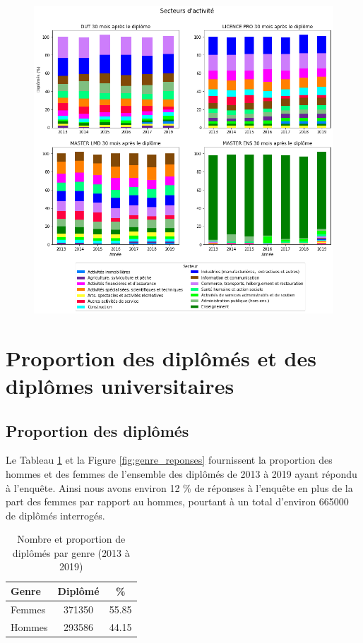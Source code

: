 \documentclass[12pt, a4paper, titlepage, table]{article}
\begin{document}
	\begin{figure}[H]
		\centering
		\includegraphics[width=1\textwidth]{../graphs/repartition_secteurs_situation.png}
	\end{figure}

\section{Proportion des diplômés et des diplômes universitaires}

	\subsection{Proportion des diplômés}
	Le Tableau \ref{tab:genre_responses} et la Figure \ref{fig:genre_reponses} fournissent la proportion des hommes et des femmes de l'ensemble des diplômés de 2013 à 2019 ayant répondu à l'enquête. Ainsi nous avons environ 12 \% de réponses à l'enquête en plus de la part des femmes par rapport au hommes, pourtant à un total d'environ 665000 de diplômés interrogés.
		\begin{table}[H]
			\centering
			\begin{tabular}{lcc}
				\toprule
				\textbf{Genre} & \textbf{Diplômé} & \textbf{\%} \\
				\midrule
				Femmes & 371350 & 55.85 \\
				Hommes & 293586 & 44.15 \\
				\bottomrule
			\end{tabular}
			\caption{Nombre et proportion de diplômés par genre (2013 à 2019)}
			\label{tab:genre_responses}
		\end{table}
	
\end{document}
